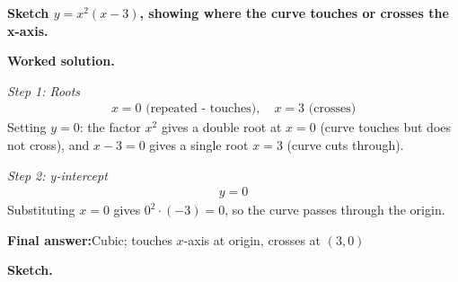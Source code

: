 \documentclass[11pt]{article}
\newcommand{\question}[1]{\par\medskip\noindent\textbf{#1}\par}
\begin{document}
\question{Sketch \( y = x^2(x-3) \), showing where the curve touches or crosses the x-axis.}

\textbf{Worked solution.}

\textit{Step 1: Roots}
\[\begin{gathered}
x = 0 \text{ (repeated - touches)}, \quad x = 3 \text{ (crosses)}
\end{gathered}\]
Setting \( y = 0 \): the factor \( x^2 \) gives a double root at \( x = 0 \) (curve touches but does not cross), and \( x - 3 = 0 \) gives a single root \( x = 3 \) (curve cuts through).

\textit{Step 2: y-intercept}
\[\begin{gathered}
y = 0
\end{gathered}\]
Substituting \( x = 0 \) gives \( 0^2 \cdot (-3) = 0 \), so the curve passes through the origin.

\begin{answerbox}
\textbf{Final answer:}\quad Cubic; touches \(\displaystyle x\)-axis at origin, crosses at \(\displaystyle (3,0)\)
\end{answerbox}
\textbf{Sketch.}
\end{document}

